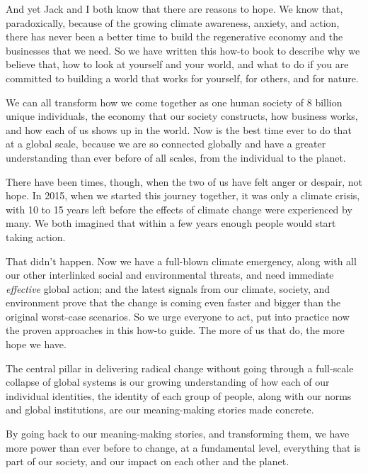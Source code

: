 And yet Jack and I both know that there are reasons to hope. We know that, paradoxically, because of the growing climate awareness, anxiety, and action, there has never been a better time to build the regenerative economy and the businesses that we need. So we have written this how-to book to describe why we believe that, how to look at yourself and your world, and what to do if you are committed to building a world that works for yourself, for others, and for nature. 


We can all transform how we come together as one human society of 8 billion unique individuals, the economy that our society constructs, how business works, and how each of us shows up in the world. Now is the best time ever to do that at a global scale, because we are so connected globally and have a greater understanding than ever before of all scales, from the individual to the planet. 


There have been times, though, when the two of us have felt anger or despair, not hope. In 2015, when we started this journey together, it was only a climate crisis, with 10 to 15 years left before the effects of climate change were experienced by many. We both imagined that within a few years enough people would start taking action. 


That didn't happen. Now we have a full-blown climate emergency, along with all our other interlinked social and environmental threats, and need immediate \emph{effective} global action; and the latest signals from our climate, society, and environment prove that the change is coming even faster and bigger than the original worst-case scenarios. So we urge everyone to act, put into practice now the proven approaches in this how-to guide. The more of us that do, the more hope we have. 


\begin{longstoryblock}
The central pillar in delivering radical change without going through a full-scale collapse of global systems is our growing understanding of how each of our individual identities, the identity of each group of people, along with our norms and global institutions, are our meaning-making stories made concrete.
\end{longstoryblock}


By going back to our meaning-making stories, and transforming them, we have more power than ever before to change, at a fundamental level, everything that is part of our society, and our impact on each other and the planet.


